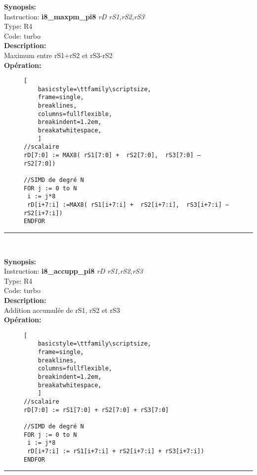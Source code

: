{\scriptsize
\textbf{Synopsis:}\\
Instruction: \textbf{i8\_maxpm\_pi8 } \textit{rD rS1,rS2,rS3}\\
Type: R4\\
Code: turbo\\
\textbf{Description:}\\
Maximum entre rS1+rS2 et rS3-rS2\\
\textbf{Opération:}\\
    \begin{figure}[H]
    \begin{lstlisting}[
    basicstyle=\ttfamily\scriptsize,
    frame=single,
    breaklines,
    columns=fullflexible,
    breakindent=1.2em,
    breakatwhitespace,
    ]
//scalaire
rD[7:0] := MAX8( rS1[7:0] +  rS2[7:0],  rS3[7:0] – rS2[7:0])
    
//SIMD de degré N
FOR j := 0 to N    
 i := j*8    
 rD[i+7:i] :=MAX8( rS1[i+7:i] +  rS2[i+7:i],  rS3[i+7:i] – rS2[i+7:i])
ENDFOR
\end{lstlisting}
\end{figure}
}
\rule{8cm}{0.4pt}\\
{\scriptsize
\textbf{Synopsis:}\\
Instruction: \textbf{i8\_accupp\_pi8 } \textit{rD rS1,rS2,rS3}\\
Type: R4\\
Code: turbo\\
\textbf{Description:}\\
Addition accumulée de rS1, rS2 et rS3\\
\textbf{Opération:}\\
    \begin{figure}[H]
    \begin{lstlisting}[
    basicstyle=\ttfamily\scriptsize,
    frame=single,
    breaklines,
    columns=fullflexible,
    breakindent=1.2em,
    breakatwhitespace,
    ]
//scalaire
rD[7:0] := rS1[7:0] + rS2[7:0] + rS3[7:0]
    
//SIMD de degré N
FOR j := 0 to N    
 i := j*8    
 rD[i+7:i] := rS1[i+7:i] + rS2[i+7:i] + rS3[i+7:i]) 
ENDFOR
\end{lstlisting}
\end{figure}
}
\rule{8cm}{0.4pt}\\

